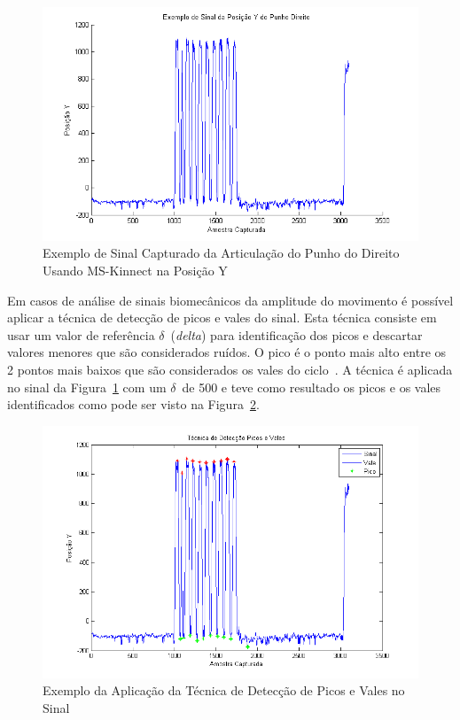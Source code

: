 \begin{figure}[!htb]
     \centering
     \includegraphics[width=1\textwidth]{./img/exsinalposicaoypunhodireito.png}
     \caption{Exemplo de Sinal Capturado da Articulação do Punho do Direito Usando MS-Kinnect na Posição Y}
     \label{img:exsinalposicaopunho}
\end{figure}

Em casos de análise de sinais biomecânicos da amplitude do movimento é possível aplicar a técnica de detecção de picos e vales do sinal. Esta técnica consiste em usar um valor de referência $\delta$\ (\textit{delta}) para identificação dos picos e descartar valores menores que são considerados ruídos. O pico é o ponto mais alto entre os 2 pontos mais baixos que são considerados os vales do ciclo~\cite{peakdetect}. A técnica é aplicada no sinal da Figura~\ref{img:exsinalposicaopunho} com um $\delta$\ de 500 e teve como resultado os picos e os vales identificados como pode ser visto na Figura~\ref{img:expicosvales}.

\begin{figure}[!htb]
     \centering
     \includegraphics[width=1\textwidth]{./img/deteccaopicosvales.png}
     \caption{Exemplo da Aplicação da Técnica de Detecção de Picos e Vales no Sinal}
     \label{img:expicosvales}
\end{figure}


